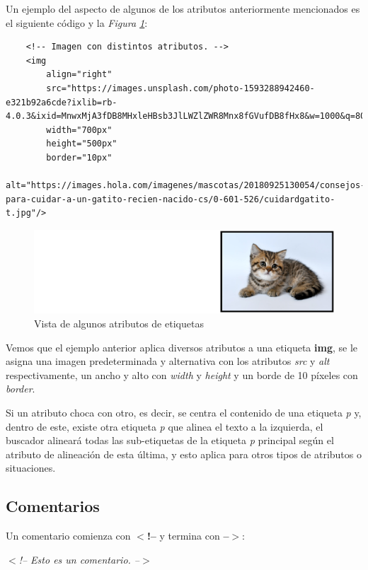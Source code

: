 Un ejemplo del aspecto de algunos de los atributos anteriormente mencionados es el siguiente código y la \textit{Figura \ref{fig: 3}}:
\begin{lstlisting}
    <!-- Imagen con distintos atributos. -->
    <img
        align="right" 
        src="https://images.unsplash.com/photo-1593288942460-e321b92a6cde?ixlib=rb-4.0.3&ixid=MnwxMjA3fDB8MHxleHBsb3JlLWZlZWR8Mnx8fGVufDB8fHx8&w=1000&q=80"
        width="700px" 
        height="500px" 
        border="10px" 
        alt="https://images.hola.com/imagenes/mascotas/20180925130054/consejos-para-cuidar-a-un-gatito-recien-nacido-cs/0-601-526/cuidardgatito-t.jpg"/>
\end{lstlisting}
\begin{figure}[H]
    \centering
    \caption{Vista de algunos atributos de etiquetas}
    \label{fig: 3}
    \includegraphics[width=13cm]{ss_html/imgs_atributos.png}
\end{figure}

Vemos que el ejemplo anterior aplica diversos atributos a una etiqueta \textbf{img}, se le asigna una imagen predeterminada y alternativa con los atributos \textit{src} y \textit{alt} respectivamente, un ancho y alto con \textit{width} y \textit{height} y un borde de 10 píxeles con \textit{border}.

Si un atributo choca con otro, es decir, se centra el contenido de una etiqueta \textit{p} y, dentro de este, existe otra etiqueta \textit{p} que alinea el texto a la izquierda, el buscador alineará todas las sub-etiquetas de la etiqueta \textit{p} principal según el atributo de alineación de esta última, y esto aplica para otros tipos de atributos o situaciones.


\subsection{Comentarios}

Un comentario comienza con \textbf{$<$!--} y termina con \textbf{--$>$}:
\begin{center}
    \textit{$<$!-- Esto es un comentario. --$>$}
\end{center}


